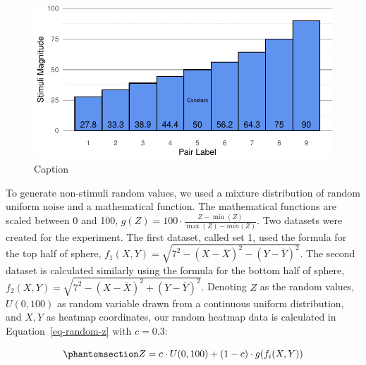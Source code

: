 \documentclass[
  letterpaper,
  DIV=11,
  numbers=noendperiod]{scrartcl}
\begin{document}
\begin{figure}[H]

{\centering \includegraphics{index_files/figure-pdf/stimuli-values-1.pdf}

}

\caption{Caption}

\end{figure}%

To generate non-stimuli random values, we used a mixture distribution of
random uniform noise and a mathematical function. The mathematical
functions are scaled between 0 and 100,
\(g(Z)=100\cdot\frac{Z-\min(Z)}{\max(Z)-min(Z)}\). Two datasets were
created for the experiment. The first dataset, called set 1, used the
formula for the top half of sphere,
\(f_1(X,Y)=\sqrt{7^2-(X-\bar{X})^2-(Y-\bar{Y})^2}\). The second dataset
is calculated similarly using the formula for the bottom half of sphere,
\(f_2(X,Y)=\sqrt{7^2-(X-\bar{X})^2+(Y-\bar{Y})^2}\). Denoting \(Z\) as
the random values, \(U(0,100)\) as random variable drawn from a
continuous uniform distribution, and \(X,Y\) as heatmap coordinates, our
random heatmap data is calculated in Equation~\ref{eq-random-z} with
\(c=0.3\):

\begin{equation}\phantomsection\label{eq-random-z}{
Z=c\cdot U(0,100)+(1-c)\cdot g(f_i(X,Y))
}\end{equation}
\end{document}

